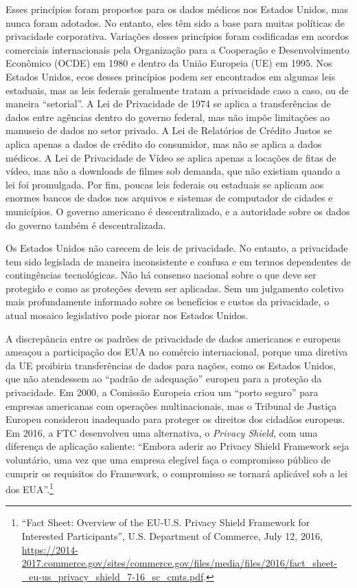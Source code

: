 \documentclass{book}
\newcommand{\ingles}[1]{\textit{#1}}
\begin{document}
Esses princípios foram propostos para os dados médicos nos Estados Unidos, mas
nunca foram adotados. No entanto, eles têm sido a base para muitas políticas de
privacidade corporativa. Variações desses princípios foram codificadas em
acordos comerciais internacionais pela Organização para a Cooperação e
Desenvolvimento Econômico (OCDE) em 1980 e dentro da União Europeia (UE) em
1995. Nos Estados Unidos, ecos desses princípios podem ser encontrados em
algumas leis estaduais, mas as leis federais geralmente tratam a privacidade
caso a caso, ou de maneira ``setorial''. A Lei de Privacidade de 1974 se aplica
a transferências de dados entre agências dentro do governo federal, mas não
impõe limitações ao manuseio de dados no setor privado. A Lei de Relatórios de
Crédito Justos se aplica apenas a dados de crédito do consumidor, mas não se
aplica a dados médicos. A Lei de Privacidade de Vídeo se aplica apenas a
locações de fitas de vídeo, mas não a downloads de filmes sob demanda, que não
existiam quando a lei foi promulgada. Por fim, poucas leis federais ou
estaduais se aplicam aos enormes bancos de dados nos arquivos e sistemas de
computador de cidades e municípios. O governo americano é descentralizado, e a
autoridade sobre os dados do governo também é descentralizada.

Os Estados Unidos não carecem de leis de privacidade. No entanto, a privacidade
tem sido legislada de maneira inconsistente e confusa e em termos dependentes
de contingências tecnológicas. Não há consenso nacional sobre o que deve ser
protegido e como as proteções devem ser aplicadas. Sem um julgamento coletivo
mais profundamente informado sobre os benefícios e custos da privacidade, o
atual mosaico legislativo pode piorar nos Estados Unidos.

A discrepância entre os padrões de privacidade de dados americanos e europeus
ameaçou a participação dos EUA no comércio internacional, porque uma diretiva
da UE proibiria transferências de dados para nações, como os Estados Unidos,
que não atendessem ao ``padrão de adequação'' europeu para a proteção da
privacidade. Em 2000, a Comissão Europeia criou um ``porto seguro'' para
empresas americanas com operações multinacionais, mas o Tribunal de Justiça
Europeu considerou inadequado para proteger os direitos dos cidadãos europeus.
Em 2016, a FTC desenvolveu uma alternativa, o \ingles{Privacy Shield}, com uma
diferença de aplicação saliente: ``Embora aderir ao Privacy Shield Framework
seja voluntário, uma vez que uma empresa elegível faça o compromisso público de
cumprir os requisitos do Framework, o compromisso se tornará aplicável sob a
lei dos EUA''.\footnote{``Fact Sheet: Overview of the EU-U.S. Privacy Shield
Framework for Interested Participants'', U.S. Department of Commerce, July 12,
2016,
\url{https://2014-2017.commerce.gov/sites/commerce.gov/files/media/files/2016/fact_sheet-_eu-us_privacy_shield_7-16_sc_cmts.pdf}.}
\end{document}
